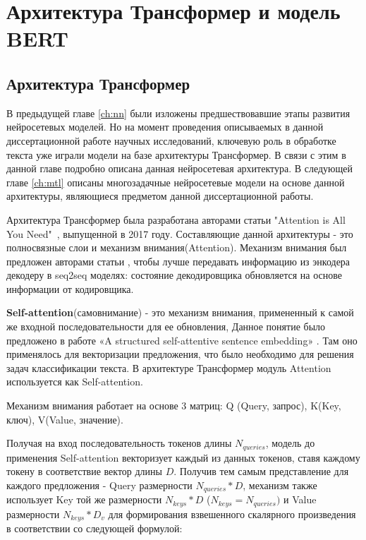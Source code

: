 \chapter{Архитектура Трансформер и модель BERT}\label{ch:tr}

\section{Архитектура Трансформер}

В предыдущей главе \ref{ch:nn} были изложены предшествовавшие этапы развития нейросетевых моделей. Но на момент проведения описываемых в данной диссертационной работе научных исследований, ключевую роль в обработке текста уже играли модели на базе архитектуры Трансформер. В связи с этим в данной главе подробно описана данная нейросетевая архитектура. В следующей главе \ref{ch:mtl} описаны многозадачные нейросетевые модели на основе данной архитектуры, являющиеся предметом данной диссертационной работы. 

Архитектура Трансформер была разработана авторами статьи "Attention is All You Need"~\cite{vaswani_2017}, выпущенной в 2017 году. Составляющие данной архитектуры - это полносвязные слои и механизм внимания(Attention). Механизм внимания был предложен авторами статьи , чтобы лучше передавать информацию из энкодера декодеру в seq2seq моделях: состояние декодировщика обновляется на основе информации от кодировщика.  

\textbf{Self-attention}(самовнимание) - это механизм внимания, примененный к самой же входной последовательности для ее обновления, Данное понятие было предложено в работе «A structured self-attentive sentence embedding» \cite{lin_2017}. Там оно применялось для векторизации предложения, что было необходимо для решения задач классификации текста. В архитектуре Трансформер модуль Attention используется как Self-attention.  

Механизм внимания работает на основе 3 матриц:  Q (Query, запрос), K(Key, ключ), V(Value, значение). 

Получая на вход последовательность токенов длины $N_{queries}$, модель до применения Self-attention векторизует каждый из данных токенов, ставя каждому токену в соответствие вектор длины $D$. Получив тем самым представление для каждого предложения - Query размерности $N_{queries}*D$, механизм также использует Key той же размерности $N_{keys}*D$ ($N_{keys}= N_{queries})$ и Value размерности $N_{keys}*D_{v}$ для формирования взвешенного скалярного произведения в соответствии со следующей формулой:

